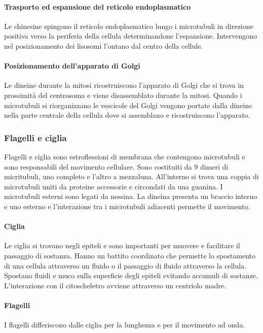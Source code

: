 			\paragraph{Trasporto ed espansione del reticolo endoplasmatico}
			Le chinesine spingono il reticolo endoplasmatico lungo i microtubuli in direzione positiva verso la periferia della cellula determinandone l'espansione.
			Intervengono nel posizionamento dei lisosomi l'ontano dal centro della cellule.

			\paragraph{Posizionamento dell'apparato di Golgi}
			Le dineine durante la mitosi ricostruiscono l'apparato di Golgi che si trova in prossimit\`a del centrosoma e viene disassemblato durante la mitosi.
			Quando i microtubuli si riorganizzano le vescicole del Golgi vengono portate dalla dineine nella parte centrale della cellula dove si assemblano e ricostruiscono l'apparato.

		\subsubsection{Flagelli e ciglia}
		Flagelli e ciglia sono estroflessioni di membrana che contengono microtubuli e sono responsabili del movimento cellulare.
		Sono costituiti da $9$ dimeri di micritubuli, uno completo e l'altro a mezzaluna.
		All'interno si trova una coppia di microtubuli uniti da proteine accessorie e circondati da una guanina.
		I microtubuli esterni sono legati da nessina.
		La dineina presenta un braccio interno e uno esterno e l'interazione tra i microtubuli adiacenti permette il movimento.

			\paragraph{Ciglia}
			Le ciglia si trovano negli epiteli e sono importanti per muovere e facilitare il passaggio di sostanza.
			Hanno un battito coordinato che permette lo spostamento di una cellula attraverso un fluido o il passaggio di fluido attraverso la cellula.
			Spostano fluidi e muco sulla superficie degli epiteli evitando accumuli di sostanze.
			L'interazione con il citoscheletro avviene attraverso un centriolo madre.

			\paragraph{Flagelli}
			I flagelli differiscono dalle ciglia per la lunghezza e per il movimento ad onda.

